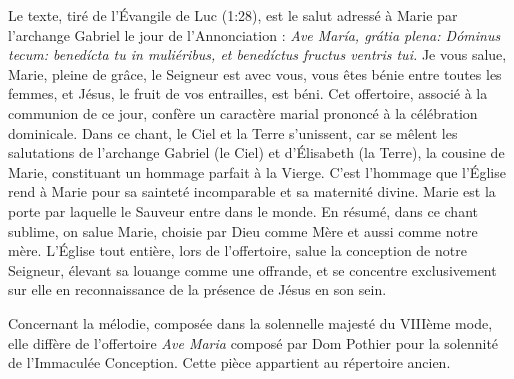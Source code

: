 \documentclass[Session2026.tex]{subfiles}
\begin{document}

Le texte, tiré de l'Évangile de Luc (1:28), est le salut adressé à Marie
par l'archange Gabriel le jour de l'Annonciation : \emph{Ave María,
grátia plena: Dóminus tecum: benedícta tu in muliéribus, et benedíctus
fructus ventris tui.} Je vous salue, Marie, pleine de grâce, le Seigneur
est avec vous, vous êtes bénie entre toutes les femmes, et Jésus, le
fruit de vos entrailles, est béni. Cet offertoire, associé à la
communion de ce jour, confère un caractère marial prononcé à la
célébration dominicale. Dans ce chant, le Ciel et la Terre s'unissent,
car se mêlent les salutations de l'archange Gabriel (le Ciel) et
d'Élisabeth (la Terre), la cousine de Marie, constituant un hommage
parfait à la Vierge. C'est l'hommage que l'Église rend à Marie pour sa
sainteté incomparable et sa maternité divine. Marie est la porte par
laquelle le Sauveur entre dans le monde. En résumé, dans ce chant
sublime, on salue Marie, choisie par Dieu comme Mère et aussi comme
notre mère. L'Église tout entière, lors de l'offertoire, salue la
conception de notre Seigneur, élevant sa louange comme une offrande, et
se concentre exclusivement sur elle en reconnaissance de la présence de
Jésus en son sein.

Concernant la mélodie, composée dans la solennelle majesté du VIIIème
mode, elle diffère de l'offertoire \emph{Ave Maria} composé par Dom
Pothier pour la solennité de l'Immaculée Conception. Cette pièce
appartient au répertoire ancien.
\end{document}
